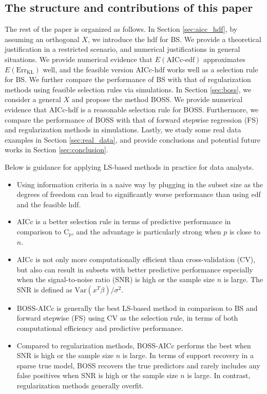 \subsection{The structure and contributions of this paper}
The rest of the paper is organized as follows. In Section \ref{sec:aicc_hdf}, by assuming an orthogonal $X$, we introduce the hdf for BS. We provide a theoretical justification in a restricted scenario, and numerical justifications in general situations. We provide numerical evidence that $E(\text{AICc-edf})$ approximates $E(\text{Err}_\text{KL})$ well, and the feasible version AICc-hdf works well as a selection rule for BS. We further compare the performance of BS with that of regularization methods using feasible selection rules via simulations. In Section \ref{sec:boss}, we consider a general $X$ and propose the method BOSS. We provide numerical evidence that AICc-hdf is a reasonable selection rule for BOSS. Furthermore, we compare the performance of BOSS with that of forward stepwise regression (FS) and regularization methods in simulations. Lastly, we study some real data examples in Section \ref{sec:real_data}, and provide conclusions and potential future works in Section \ref{sec:conclusion}.

Below is guidance for applying LS-based methods in practice for data analysts.
\begin{itemize}
	\item Using information criteria in a naive way by plugging in the subset size as the degrees of freedom can lead to significantly worse performance than using edf and the feasible hdf.
	\item AICc is a better selection rule in terms of predictive performance in comparison to C$_p$, and the advantage is particularly strong when $p$ is close to $n$.
	\item AICc is not only more computationally efficient than cross-validation (CV), but also can result in subsets with better predictive performance especially when the signal-to-noise ratio (SNR) is high or the sample size $n$ is large. The SNR is defined as $\text{Var}(x^T \beta) / \sigma^2$.
	\item BOSS-AICc is generally the best LS-based method in comparison to BS and forward stepwise (FS) \citep{efroymson1960multiple} using CV as the selection rule, in terms of both computational efficiency and predictive performance.
	\item Compared to regularization methods, BOSS-AICc performs the best when SNR is high or the sample size $n$ is large. In terms of support recovery in a sparse true model, BOSS recovers the true predictors and rarely includes any false positives when SNR is high or the sample size $n$ is large. In contrast, regularization methods generally overfit. 
\end{itemize}

